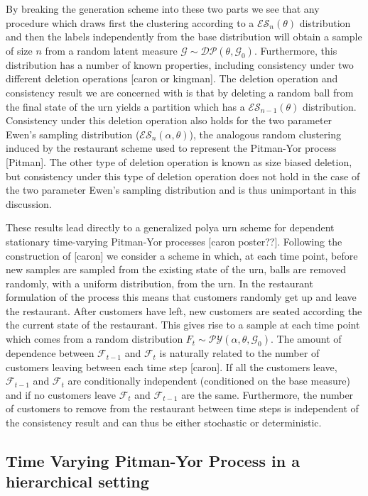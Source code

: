 \documentclass[12pt]{amsart}
\newcommand{\F}{\mathcal{F}}
\newcommand{\PY}{\mathcal{P}\mathcal{Y}}
\newcommand{\G}{\mathcal{G}}
\newcommand{\ES}{\mathcal{E}\mathcal{S}}
\newcommand{\DP}{\mathcal{D}\mathcal{P}}
\begin{document}
By breaking the generation scheme into these two parts we see that any procedure which draws first the clustering according to a $\ES_ n(\theta)$ distribution and then the labels independently from the base distribution will obtain a sample of size $n$ from a random latent measure $\G \sim \DP(\theta,\G_0)$.  Furthermore, this distribution has a number of known properties, including consistency under two different deletion operations [caron or kingman].  The deletion operation and consistency result we are concerned with is that by deleting a random ball from the final state of the urn yields a partition which has a $\ES_{n-1}(\theta)$ distribution.  Consistency under this deletion operation also holds for the two parameter Ewen's sampling distribution ($\ES_n(\alpha,\theta)$), the analogous random clustering induced by the restaurant scheme used to represent the Pitman-Yor process [Pitman]. The other type of deletion operation is known as size biased deletion, but consistency under this type of deletion operation does not hold in the case of the two parameter Ewen's sampling distribution and is thus unimportant in this discussion.

These results lead directly to a generalized polya urn scheme for dependent stationary time-varying Pitman-Yor processes [caron poster??].  Following the construction of [caron] we consider a scheme in which, at each time point, before new samples are sampled from the existing state of the urn, balls are removed randomly, with a uniform distribution, from the urn.  In the restaurant formulation of the process this means that customers randomly get up and leave the restaurant.  After customers have left, new customers are seated according the the current state of the restaurant.  This gives rise to a sample at each time point which comes from a random distribution $F_t \sim \PY(\alpha, \theta,\G_0)$.  The amount of dependence between $\F_{t-1}$ and $\F_t$ is naturally related to the number of customers leaving between each time step [caron].  If all the customers leave, $\F_{t-1}$ and $\F_t$ are conditionally independent (conditioned on the base measure) and if no customers leave $\F_t$ and $\F_{t-1}$ are the same.  Furthermore, the number of customers to remove from the restaurant between time steps is independent of the consistency result and can thus be either stochastic or deterministic.

\subsection{Time Varying Pitman-Yor Process in a hierarchical setting}
\end{document}
